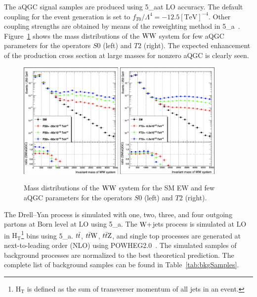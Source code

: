 The aQGC signal samples are produced using \MADGRAPH{}5\_a\MCATNLO at LO accuracy. The default coupling for the event generation is set to $f_{T0} / \Lambda^{4} = -12.5 [\mathrm{TeV}]^{-4}$. Other coupling strengths are obtained by means of the reweighting method in \MADGRAPH{}5\_a\MCATNLO~\cite{Mattelaer2016,Mattelaer-reweight}. Figure~\ref{fig:aqgc_signal} shows the mass distributions of the  $\mathrm{W} \mathrm{W}$ system for few aQGC parameters for the operators $S0$ (left) and $T2$ (right). The expected enhancement of the production cross section at large masses for nonzero aQGC is clearly seen.      
  
\begin{figure}[!htbp]
\centering
\includegraphics[width=0.45\textwidth]{Plots/aQGC_Signal_Scaling/mWW_FS0.png}
\includegraphics[width=0.45\textwidth]{Plots/aQGC_Signal_Scaling/mWW_FT2.png}
\caption{Mass distributions of the $\mathrm{W} \mathrm{W}$ system for the SM EW and few aQGC parameters for the operators $S0$ (left) and $T2$ (right).}
\label{fig:aqgc_signal}
\end{figure}



The Drell--Yan process is simulated with one, two, three, and four outgoing partons at Born level at LO using \MADGRAPH{}5\_a\MCATNLO. The $\mathrm{W}+$jets process is simulated at LO in $\mathrm{H_{T}}$\footnote{$\mathrm{H_T}$ is defined as the sum of transverser momentum of all jets in an event.} bins using \MADGRAPH{}5\_a\MCATNLO. $t\bar{t}$, $t\bar{t} \mathrm{W}$, $t\bar{t} \mathrm{Z}$, and single top processes are generated at next-to-leading order (NLO) using \textsc{POWHEG2.0}~\cite{Alioli:2008gx,Nason:2004rx,Frixione:2007vw,powheg:2010}. The simulated samples of background processes are normalized to the best theoretical prediction. The complete list of background samples can be found in Table~\ref{tab:bkgSamples}.


